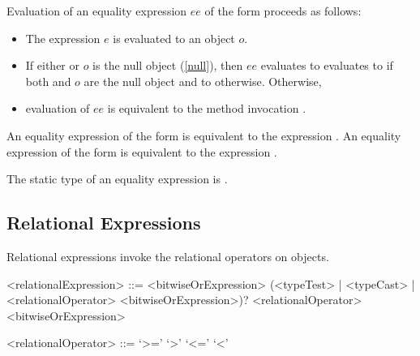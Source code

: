 \documentclass[makeidx]{article}
\begin{document}
{\LMHash{}%
Evaluation of an equality expression $ee$ of the form  proceeds as follows:
\begin{itemize}
\item The expression $e$ is evaluated to an object $o$.
\item If either \THIS{} or $o$ is the null object (\ref{null}), then $ee$ evaluates to evaluates to \TRUE{} if both \THIS{} and $o$ are the null object and to \FALSE{} otherwise.
Otherwise,
\item evaluation of $ee$ is equivalent to the method invocation .
\end{itemize}


\LMHash{}%
An equality expression of the form  is equivalent to the expression .
An equality expression of the form  is equivalent to the expression .


\LMHash{}%
The static type of an equality expression is .


\subsection{Relational Expressions}

\LMHash{}%
Relational expressions invoke the relational operators on objects.

\begin{grammar}
<relationalExpression> ::= <bitwiseOrExpression> \gnewline{}
  (<typeTest> | <typeCast> | <relationalOperator> <bitwiseOrExpression>)?
  \alt \SUPER{} <relationalOperator> <bitwiseOrExpression>

<relationalOperator> ::= `>='
  \alt `>'
  \alt `<='
  \alt `<'
\end{grammar}

}
\end{document}
